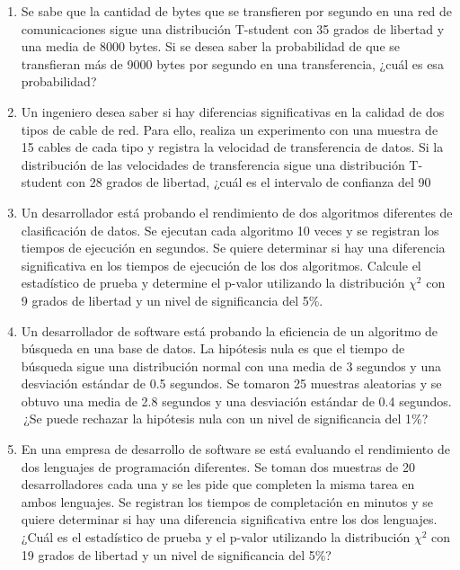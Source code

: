 \begin{Ejer}
\begin{enumerate}
\item Se sabe que la cantidad de bytes que se transfieren por segundo en una red de comunicaciones sigue una distribuci\'on T-student con 35 grados de libertad y una media de 8000 bytes. Si se desea saber la probabilidad de que se transfieran m\'as de 9000 bytes por segundo en una transferencia, ¿cu\'al es esa probabilidad?

\item Un ingeniero desea saber si hay diferencias significativas en la calidad de dos tipos de cable de red. Para ello, realiza un experimento con una muestra de 15 cables de cada tipo y registra la velocidad de transferencia de datos. Si la distribuci\'on de las velocidades de transferencia sigue una distribuci\'on T-student con 28 grados de libertad, ¿cu\'al es el intervalo de confianza del 90

\item Un desarrollador est\'a probando el rendimiento de dos algoritmos diferentes de clasificaci\'on de datos. Se ejecutan cada algoritmo 10 veces y se registran los tiempos de ejecuci\'on en segundos. Se quiere determinar si hay una diferencia significativa en los tiempos de ejecuci\'on de los dos algoritmos. Calcule el estad\'istico de prueba y determine el p-valor utilizando la distribuci\'on $\chi^2$ con 9 grados de libertad y un nivel de significancia del 5\%.

\item Un desarrollador de software est\'a probando la eficiencia de un algoritmo de b\'usqueda en una base de datos. La hip\'otesis nula es que el tiempo de b\'usqueda sigue una distribuci\'on normal con una media de 3 segundos y una desviaci\'on est\'andar de 0.5 segundos. Se tomaron 25 muestras aleatorias y se obtuvo una media de 2.8 segundos y una desviaci\'on est\'andar de 0.4 segundos. \,¿Se puede rechazar la hip\'otesis nula con un nivel de significancia del 1\%?

\item En una empresa de desarrollo de software se est\'a evaluando el rendimiento de dos lenguajes de programaci\'on diferentes. Se toman dos muestras de 20 desarrolladores cada una y se les pide que completen la misma tarea en ambos lenguajes. Se registran los tiempos de completaci\'on en minutos y se quiere determinar si hay una diferencia significativa entre los dos lenguajes. \,¿Cu\'al es el estad\'istico de prueba y el p-valor utilizando la distribuci\'on $\chi^2$ con 19 grados de libertad y un nivel de significancia del 5\%?


\end{enumerate}
\end{Ejer} 


